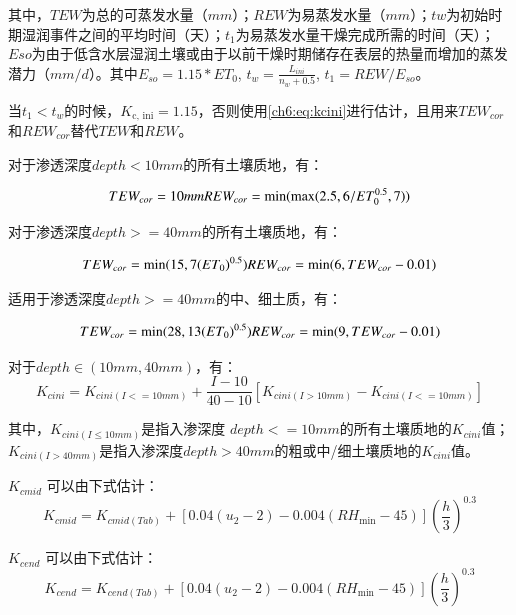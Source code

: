 其中，$TEW$为总的可蒸发水量（$mm$）；$REW$为易蒸发水量（$mm$）；$tw$为初始时期湿润事件之间的平均时间（天）；$t_1$为易蒸发水量干燥完成所需的时间（天）；$Eso$为由于低含水层湿润土壤或由于以前干燥时期储存在表层的热量而增加的蒸发潜力（$mm/d$）。其中$E_{so} = 1.15 * ET_0$, $t_w = \frac{L_{ini}}{n_w + 0.5}$, $t_1 = REW / E_{so}$。

当$t_1 < t_w$的时候，$K_{\text {c, ini}} = 1.15$，否则使用\ref{ch6:eq:kcini}进行估计，且用来$TEW_{cor}$和$REW_{cor}$替代$TEW$和$REW$。

对于渗透深度$depth < 10mm$的所有土壤质地，有：

\begin{equation}
    TEW_{cor} = 10mm \\
    REW_{cor} = \min(\max(2.5, 6 / ET_0^{0.5}, 7))
\end{equation}

对于渗透深度$depth >= 40mm$的所有土壤质地，有：

\begin{equation}
    TEW_{cor} = \min(15, 7 {(ET_0)}^{0.5}) \\
    REW_{cor} = \min(6, TEW_{cor} - 0.01)
\end{equation}

适用于渗透深度$depth >= 40mm$的中、细土质，有：

\begin{equation}
    TEW_{cor} = \min(28, 13{(ET_0)}^{0.5}) \\
    REW_{cor} = \min(9, TEW_{cor} - 0.01)
\end{equation}

对于$depth \in (10mm, 40mm)$，有：
\begin{equation}
    K_{c ini} = K_{c ini(I<=10mm)} + \frac{I-10}{40-10}[K_{c ini(I>10mm)} - K_{c ini(I<=10mm)}]
\end{equation}

其中，$K_{c ini(I≤10mm)}$是指入渗深度 $depth<=10 mm$的所有土壤质地的$K_{c ini}$值；$K_{c ini(I > 40 mm)}$是指入渗深度$depth>40 mm$的粗或中/细土壤质地的$K_{c ini}$值。

$K_{c mid}$ 可以由下式估计：
\begin{equation}
    K_{c mid} = K_{c mid(Tab)} + [0.04(u_2 - 2) -0.004(RH_{\min} - 45)]{(\frac{h}{3})}^{0.3}
\end{equation}

$K_{c end}$ 可以由下式估计：
\begin{equation}
    K_{c end} = K_{c end(Tab)} + [0.04(u_2 - 2) -0.004(RH_{\min} - 45)]{(\frac{h}{3})}^{0.3}
\end{equation}

